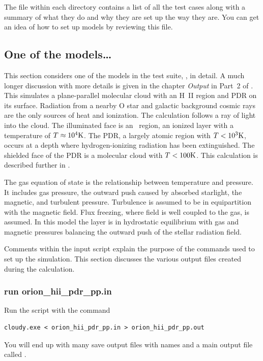 \documentclass[12pt,twoside]{article}
\begin{document}
{The file  within
each directory contains a list of all
the test cases along with a summary of what they do and why they are set
up the way they are.  You can get an idea of how to set up models by
reviewing this file.

\subsection{One of the models\ldots}

This section considers one of the models in the test suite,
, in detail.  A
much longer discussion with more details
is given in the chapter \emph{Output} in Part~2 of \Hazy.
This simulates a
plane-parallel molecular cloud with an H~II region and PDR on its surface.
Radiation from a nearby O star and galactic background cosmic rays are the
only sources of heat and ionization.  The calculation follows a ray of light
into the cloud.  The illuminated face is an \hplus\ region, an ionized layer
with a temperature of $T \approx 10^4\rm{K}$.
The PDR, a largely atomic region with
$T < 10^3\rm{K}$, occurs at a depth where
hydrogen-ionizing radiation has been
extinguished.  The shielded face of the PDR is a molecular
cloud with $T < 100\rm{K}$.
This calculation is described further in \citet{Ferland03}.

The gas equation of state is the relationship between temperature and
pressure.  It includes gas pressure, the outward push caused by absorbed
starlight, the magnetic, and turbulent pressure.   Turbulence is assumed
to be in equipartition with the magnetic field.
Flux freezing, where field is well coupled to the gas, is assumed.
In this model the layer is in hydrostatic equilibrium with gas and magnetic
pressures balancing the outward push of the stellar radiation field.

Comments within the input script explain the purpose of the commands
used to set up the simulation.
This section discusses the various output
files created during the calculation.

\subsubsection{run orion\_hii\_pdr\_pp.in}

Run the  script with the command
\small
\begin{verbatim}
cloudy.exe < orion_hii_pdr_pp.in > orion_hii_pdr_pp.out
\end{verbatim}
\normalsize
You will end up with many save output files with names
and a main output file called .

}
\end{document}
